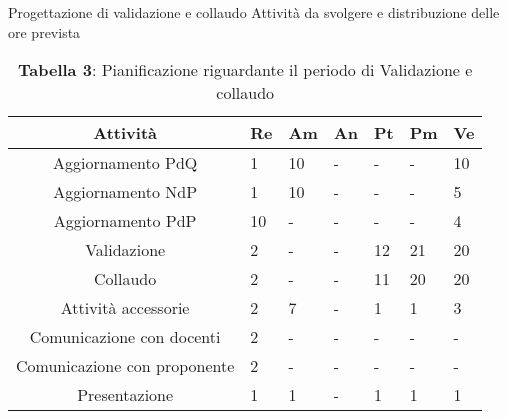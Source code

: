 Progettazione di validazione e collaudo
Attività da svolgere e distribuzione delle ore prevista
\begin{table}[H]
	\centering
	\renewcommand{\arraystretch}{1.5}
	\begin{tabular}{|c|p{10mm}|p{10mm}|p{10mm}|p{10mm}|p{10mm}|p{10mm}|}
		\hline
		\rowcolor{lighter-grayer}
		Attività & Re & Am & An & Pt & Pm & Ve \\ \hline
		Aggiornamento PdQ          & 1  & 10 & - & - & - & 10 \\ \hline
		Aggiornamento NdP          & 1  & 10 & - & - & - & 5  \\ \hline
		Aggiornamento PdP          & 10 & - & - & - & - & 4  \\ \hline
		Validazione                & 2  & - & - & 12 & 21 & 20 \\ \hline
		Collaudo                   & 2  & - & - & 11 & 20 & 20 \\ \hline
		Attività accessorie 	   & 2  & 7  & - & 1  & 1  & 3  \\ \hline
		Comunicazione con docenti  & 2  & - & - & - & - & -   \\ \hline
		Comunicazione con proponente& 2  & - & - & - & - & -   \\ \hline
		Presentazione              & 1  & 1  & - & 1  & 1  & 1 \\
		\hline
	\end{tabular}
	\caption*{\textbf{Tabella 3}: Pianificazione riguardante il periodo di Validazione e collaudo\\}
\end{table}